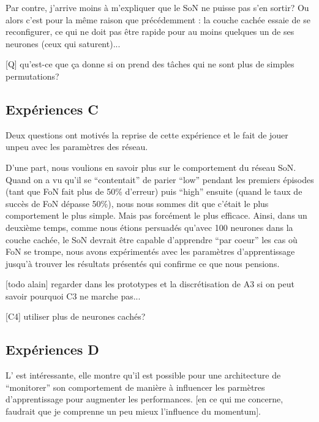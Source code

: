 Par contre, j'arrive moins à m'expliquer que le SoN ne puisse pas s'en sortir? Ou alors c'est pour la même raison que précédemment : la couche cachée essaie de se reconfigurer, ce qui ne doit pas être rapide pour au moins quelques un de ses neurones (ceux qui saturent)...

[Q] qu'est-ce que ça donne si on prend des tâches qui ne sont plus de simples permutations?

\subsection{Expériences C
\label{sec:expC}}

Deux questions ont motivés la reprise de cette expérience et le fait de jouer unpeu avec les paramètres des réseau. 

D'une part, nous voulions en savoir plus sur le comportement du réseau SoN. Quand on a vu qu'il se ``contentait'' de parier ``low'' pendant les premiers épisodes (tant que FoN fait plus de 50\% d'erreur) puis ``high'' ensuite (quand le taux de succès de FoN dépasse 50\%), nous nous sommes dit que c'était le plus comportement le plus simple. Mais pas forcément le plus efficace.
Ainsi, dans un deuxième temps, comme nous étions persuadés qu'avec 100 neurones dans la couche cachée, le SoN devrait être capable d'apprendre ``par coeur'' les cas où FoN se trompe, nous avons expérimentés avec les paramètres d'apprentissage jusqu'à trouver les résultats présentés qui confirme ce que nous pensions.

[todo alain] regarder dans les prototypes et la discrétisation de A3 si on peut savoir pourquoi C3 ne marche pas...

[C4] utiliser plus de neurones cachés?

\subsection{Expériences D
\label{sec:expD}}

L' est intéressante, elle montre qu'il est possible pour une architecture de ``monitorer'' son comportement de manière à influencer les parmètres d'apprentissage pour augmenter les performances. [en ce qui me concerne, faudrait que je comprenne un peu mieux l'influence du momentum].

